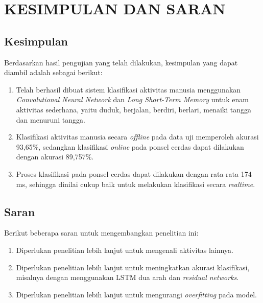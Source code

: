 \chapter{KESIMPULAN DAN SARAN}

\section{Kesimpulan}
Berdasarkan hasil pengujian yang telah dilakukan, kesimpulan yang dapat diambil adalah sebagai berikut:

\begin{enumerate}
    \item Telah berhasil dibuat sistem klasifikasi aktivitas manusia menggunakan \textit{Convolutional Neural Network} dan \textit{Long Short-Term Memory} untuk enam aktivitas sederhana, yaitu duduk, berjalan, berdiri, berlari, menaiki tangga dan menuruni tangga.
    \item Klasifikasi aktivitas manusia secara \textit{offline} pada data uji memperoleh akurasi 93,65\%, sedangkan klasifikasi \textit{online} pada ponsel cerdas dapat dilakukan dengan akurasi 89,757\%.
    \item Proses klasifikasi pada ponsel cerdas dapat dilakukan dengan rata-rata 174 ms, sehingga dinilai cukup baik untuk melakukan klasifikasi secara \textit{realtime}.
\end{enumerate}

\section{Saran}
Berikut beberapa saran untuk mengembangkan penelitian ini:

\begin{enumerate}
    \item Diperlukan penelitian lebih lanjut untuk mengenali aktivitas lainnya.
    \item Diperlukan penelitian lebih lanjut untuk meningkatkan akurasi klasifikasi, misalnya dengan menggunakan LSTM dua arah dan \textit{residual networks}.
    \item Diperlukan penelitian lebih lanjut untuk mengurangi \textit{overfitting} pada model.
\end{enumerate}
